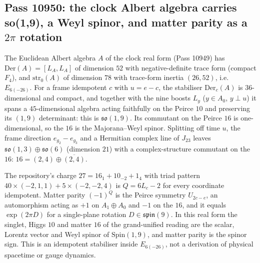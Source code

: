 \subsection{Pass 10950: the clock Albert algebra carries so(1,9), a Weyl spinor, and matter parity as a $2\pi$ rotation}

The Euclidean Albert algebra $A$ of the clock real form (Pass 10949) has
$\mathrm{Der}(A)=[L_A,L_A]$ of dimension $52$ with negative-definite trace form
(compact $F_4$), and $\mathrm{str}_0(A)$ of dimension $78$ with trace-form inertia
$(26,52)$, i.e.\ $E_{6(-26)}$.  For a frame idempotent $c$ with $u=e-c$, the
stabiliser $\mathrm{Der}_c(A)$ is $36$-dimensional and compact, and together with
the nine boosts $L_y$ ($y\in A_0$, $y\perp u$) it spans a $45$-dimensional algebra
acting faithfully on the Peirce $10$ and preserving its $(1,9)$ determinant: this
is $\mathfrak{so}(1,9)$.  Its commutant on the Peirce $16$ is one-dimensional, so the
$16$ is the Majorana--Weyl spinor.  Splitting off time $u$, the frame direction
$e_{g_2}-e_{g_3}$ and a Hermitian complex line of $J_{23}$ leaves
$\mathfrak{so}(1,3)\oplus\mathfrak{so}(6)$ (dimension $21$) with a complex-structure
commutant on the $16$: $16=(2,4)\oplus\overline{(2,4)}$.

The repository's charge $27=16_1+10_{-2}+1_4$ with triad pattern
$40\times(-2,1,1)+5\times(-2,-2,4)$ is $Q=6L_c-2$ for every coordinate idempotent.
Matter parity $(-1)^Q$ is the Peirce symmetry $U_{2c-e}$, an automorphism acting as
$+1$ on $A_1\oplus A_0$ and $-1$ on the $16$, and it equals $\exp(2\pi D)$ for a
single-plane rotation $D\in\mathfrak{spin}(9)$.  In this real form the singlet,
Higgs $10$ and matter $16$ of the grand-unified reading are the scalar, Lorentz
vector and Weyl spinor of $\mathrm{Spin}(1,9)$, and matter parity is the spinor sign.
This is an idempotent stabiliser inside $E_{6(-26)}$, not a derivation of physical
spacetime or gauge dynamics.
